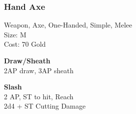 \subsubsection{Hand Axe}\label{weapon:handAxe}
Weapon, Axe, One-Handed, Simple, Melee\\
Size: M\\
Cost: 70 Gold

\textbf{Draw/Sheath}\\
2AP draw, 3AP sheath

\textbf{Slash}\\
2 AP, ST to hit,  Reach\\
2d4 + \texttimes ST Cutting Damage

